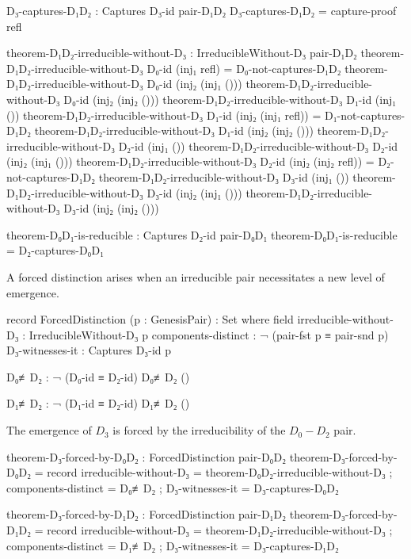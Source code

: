 \documentclass[11pt,a4paper]{book}
\begin{document}
\begin{code}
D₃-captures-D₁D₂ : Captures D₃-id pair-D₁D₂
D₃-captures-D₁D₂ = capture-proof refl

theorem-D₁D₂-irreducible-without-D₃ : IrreducibleWithout-D₃ pair-D₁D₂
theorem-D₁D₂-irreducible-without-D₃ D₀-id (inj₁ refl) = D₀-not-captures-D₁D₂
theorem-D₁D₂-irreducible-without-D₃ D₀-id (inj₂ (inj₁ ()))
theorem-D₁D₂-irreducible-without-D₃ D₀-id (inj₂ (inj₂ ()))
theorem-D₁D₂-irreducible-without-D₃ D₁-id (inj₁ ())
theorem-D₁D₂-irreducible-without-D₃ D₁-id (inj₂ (inj₁ refl)) = D₁-not-captures-D₁D₂
theorem-D₁D₂-irreducible-without-D₃ D₁-id (inj₂ (inj₂ ()))
theorem-D₁D₂-irreducible-without-D₃ D₂-id (inj₁ ())
theorem-D₁D₂-irreducible-without-D₃ D₂-id (inj₂ (inj₁ ()))
theorem-D₁D₂-irreducible-without-D₃ D₂-id (inj₂ (inj₂ refl)) = D₂-not-captures-D₁D₂
theorem-D₁D₂-irreducible-without-D₃ D₃-id (inj₁ ())
theorem-D₁D₂-irreducible-without-D₃ D₃-id (inj₂ (inj₁ ()))
theorem-D₁D₂-irreducible-without-D₃ D₃-id (inj₂ (inj₂ ()))

theorem-D₀D₁-is-reducible : Captures D₂-id pair-D₀D₁
theorem-D₀D₁-is-reducible = D₂-captures-D₀D₁

\end{code}

A forced distinction arises when an irreducible pair necessitates a new level of emergence.

\begin{code}
record ForcedDistinction (p : GenesisPair) : Set where
  field
    irreducible-without-D₃ : IrreducibleWithout-D₃ p
    components-distinct : ¬ (pair-fst p ≡ pair-snd p)
    D₃-witnesses-it : Captures D₃-id p

D₀≢D₂ : ¬ (D₀-id ≡ D₂-id)
D₀≢D₂ ()

D₁≢D₂ : ¬ (D₁-id ≡ D₂-id)
D₁≢D₂ ()

\end{code}

The emergence of $D_3$ is forced by the irreducibility of the $D_0-D_2$ pair.

\begin{code}
theorem-D₃-forced-by-D₀D₂ : ForcedDistinction pair-D₀D₂
theorem-D₃-forced-by-D₀D₂ = record
  { irreducible-without-D₃ = theorem-D₀D₂-irreducible-without-D₃
  ; components-distinct = D₀≢D₂
  ; D₃-witnesses-it = D₃-captures-D₀D₂
  }

theorem-D₃-forced-by-D₁D₂ : ForcedDistinction pair-D₁D₂
theorem-D₃-forced-by-D₁D₂ = record
  { irreducible-without-D₃ = theorem-D₁D₂-irreducible-without-D₃
  ; components-distinct = D₁≢D₂
  ; D₃-witnesses-it = D₃-captures-D₁D₂
  }
\end{code}
\end{document}
